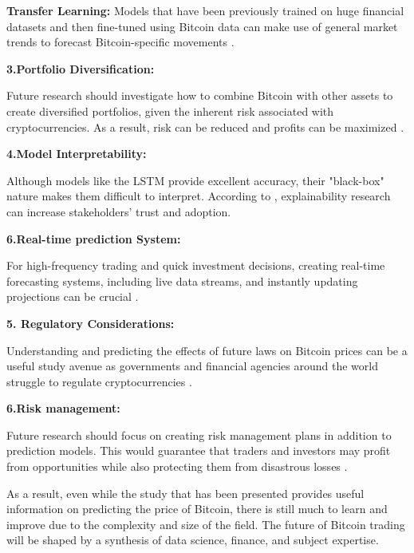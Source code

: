 \textbf{Transfer Learning:} Models that have been previously trained on huge financial datasets and then fine-tuned using Bitcoin data can make use of general market trends to forecast Bitcoin-specific movements \citep{he2019transfer}.

\textbf{3.Portfolio Diversification:}

Future research should investigate how to combine Bitcoin with other assets to create diversified portfolios, given the inherent risk associated with cryptocurrencies. As a result, risk can be reduced and profits can be maximized \citep{guesmi2019portfolio}.

\textbf{4.Model Interpretability:}

Although models like the LSTM provide excellent accuracy, their "black-box" nature makes them difficult to interpret. According to \cite{DBLP:conf/kdd/Ribeiro0G16}, explainability research can increase stakeholders' trust and adoption.

\textbf{6.Real-time prediction System:}

For high-frequency trading and quick investment decisions, creating real-time forecasting systems, including live data streams, and instantly updating projections can be crucial \citep{xu2013emr}.

\textbf{5. Regulatory Considerations:}

Understanding and predicting the effects of future laws on Bitcoin prices can be a useful study avenue as governments and financial agencies around the world struggle to regulate cryptocurrencies \citep{zohar2015bitcoin}.

\textbf{6.Risk management:}

Future research should focus on creating risk management plans in addition to prediction models. This would guarantee that traders and investors may profit from opportunities while also protecting them from disastrous losses \citep{hull2012risk}.

As a result, even while the study that has been presented provides useful information on predicting the price of Bitcoin, there is still much to learn and improve due to the complexity and size of the field. The future of Bitcoin trading will be shaped by a synthesis of data science, finance, and subject expertise.

